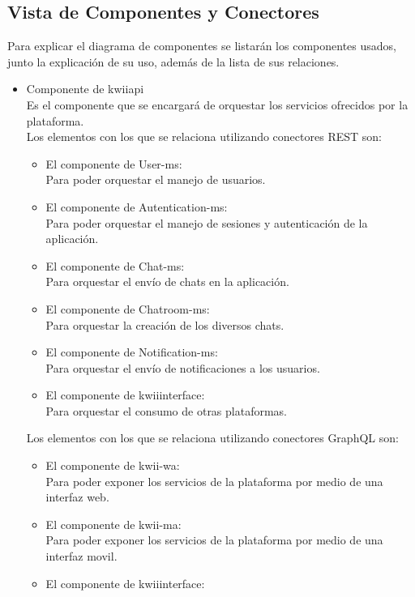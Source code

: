 \subsection{Vista de Componentes y Conectores}
Para explicar el diagrama de componentes se listarán los componentes usados, junto la explicación de su uso, además de la lista de sus relaciones.
\begin{itemize}
    \item Componente de kwii\textunderscore api\\
    Es el componente que se encargará de orquestar los servicios ofrecidos por la plataforma.\\
    Los elementos con los que se relaciona utilizando conectores REST son:
    \begin{itemize}
        \item El componente de User-ms:\\
        Para poder orquestar el manejo de usuarios.
        \item El componente de Autentication-ms:\\
        Para poder orquestar el manejo de sesiones y autenticación de la aplicación.
        \item El componente de Chat-ms:\\
        Para orquestar el envío de chats en la aplicación.
        \item El componente de Chatroom-ms:\\
        Para orquestar la creación de los diversos chats.
        \item El componente de Notification-ms:\\
        Para orquestar el envío de notificaciones a los usuarios.
        \item El componente de kwii\textunderscore interface:\\
        Para orquestar el consumo de otras plataformas.
    \end{itemize}
    Los elementos con los que se relaciona utilizando conectores GraphQL son:
    \begin{itemize}
        \item El componente de kwii-wa:\\
        Para poder exponer los servicios de la plataforma por medio de una interfaz web.
        \item El componente de kwii-ma:\\
        Para poder exponer los servicios de la plataforma por medio de una interfaz movil.
        \item El componente de kwii\textunderscore interface:\\

\end{itemize}
\end{itemize}
